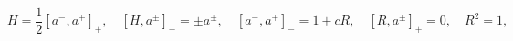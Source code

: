 \begin{equation}
\label{RH}
H=\frac 12 [a^-, a^+]_+, \quad
[H, a^{\pm}]_-=\pm a^{\pm}, \quad
 [a^-, a^+]_-=1+c R, \quad
[R, a^{\pm}]_+=0,\quad R^2=1,
\end{equation}

